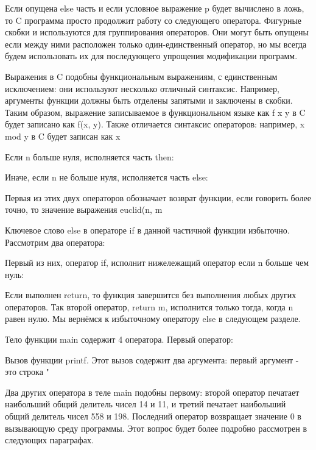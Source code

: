 Если опущена else часть и если условное выражение p будет вычислено в ложь, то C программа просто продолжит работу со следующего оператора. Фигурные скобки { и } используются для группирования операторов. Они могут быть опущены если между ними расположен только один-единственный оператор, но мы всегда будем использовать их для последующего упрощения модификации программ. 

Выражения в C подобны функциональным выражениям, с единственным исключением: они используют несколько отличный синтаксис. Например, аргументы функции должны быть отделены запятыми и заключены в скобки. Таким образом, выражение записываемое в функциональном языке как f x y в C будет записано как f(x, y). Также отличается синтаксис операторов: например, x mod y в C будет записан как x%

Если n больше нуля, исполняется часть then:

Иначе, если n не больше нуля, исполняется часть else:

Первая из этих двух операторов обозначает возврат функции, если говорить более точно, то значение выражения euclid(n, m%

Ключевое слово else в операторе if в данной частичной функции избыточно. Рассмотрим два оператора:

Первый из них, оператор if, исполнит нижележащий оператор если n больше чем нуль:

Если выполнен return, то функция завершится без выполнения любых других операторов. Так второй оператор, return m, исполнится только тогда, когда n равен нулю. Мы вернёмся к избыточному оператору else в следующем разделе.

Тело функции main содержит 4 оператора. Первый оператор:

Вызов функции printf. Этот вызов содержит два аргумента: первый аргумент - это строка "%

Два других оператора в теле main подобны первому: второй оператор печатает наибольший общий делитель чисел 14 и 11, и третий печатает наибольший общий делитель чисел 558 и 198. Последний оператор возвращает значение 0 в вызывающую среду программы. Этот вопрос будет более подробно рассмотрен в следующих параграфах.

